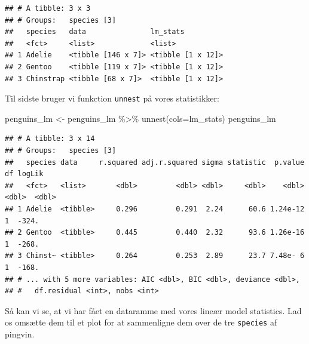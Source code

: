 \documentclass[
]{book}
\newenvironment{Shaded}{\begin{snugshade}}{\end{snugshade}}
\newcommand{\AttributeTok}[1]{\textcolor[rgb]{0.77,0.63,0.00}{#1}}
\newcommand{\FunctionTok}[1]{\textcolor[rgb]{0.00,0.00,0.00}{#1}}
\newcommand{\NormalTok}[1]{#1}
\newcommand{\OtherTok}[1]{\textcolor[rgb]{0.56,0.35,0.01}{#1}}
\newcommand{\SpecialCharTok}[1]{\textcolor[rgb]{0.00,0.00,0.00}{#1}}
\begin{document}
\begin{verbatim}
## # A tibble: 3 x 3
## # Groups:   species [3]
##   species   data               lm_stats         
##   <fct>     <list>             <list>           
## 1 Adelie    <tibble [146 x 7]> <tibble [1 x 12]>
## 2 Gentoo    <tibble [119 x 7]> <tibble [1 x 12]>
## 3 Chinstrap <tibble [68 x 7]>  <tibble [1 x 12]>
\end{verbatim}

Til sidste bruger vi funkction \texttt{unnest} på vores statistikker:

\begin{Shaded}
\begin{Highlighting}[]
\NormalTok{penguins\_lm }\OtherTok{\textless{}{-}}\NormalTok{ penguins\_lm }\SpecialCharTok{\%\textgreater{}\%}
  \FunctionTok{unnest}\NormalTok{(}\AttributeTok{cols=}\NormalTok{lm\_stats)}
\NormalTok{penguins\_lm}
\end{Highlighting}
\end{Shaded}

\begin{verbatim}
## # A tibble: 3 x 14
## # Groups:   species [3]
##   species data     r.squared adj.r.squared sigma statistic  p.value    df logLik
##   <fct>   <list>       <dbl>         <dbl> <dbl>     <dbl>    <dbl> <dbl>  <dbl>
## 1 Adelie  <tibble>     0.296         0.291  2.24      60.6 1.24e-12     1  -324.
## 2 Gentoo  <tibble>     0.445         0.440  2.32      93.6 1.26e-16     1  -268.
## 3 Chinst~ <tibble>     0.264         0.253  2.89      23.7 7.48e- 6     1  -168.
## # ... with 5 more variables: AIC <dbl>, BIC <dbl>, deviance <dbl>,
## #   df.residual <int>, nobs <int>
\end{verbatim}

Så kan vi se, at vi har fået en dataramme med vores lineær model statistics. Lad os omsætte dem til et plot for at sammenligne dem over de tre \texttt{species} af pingvin.
\end{document}
